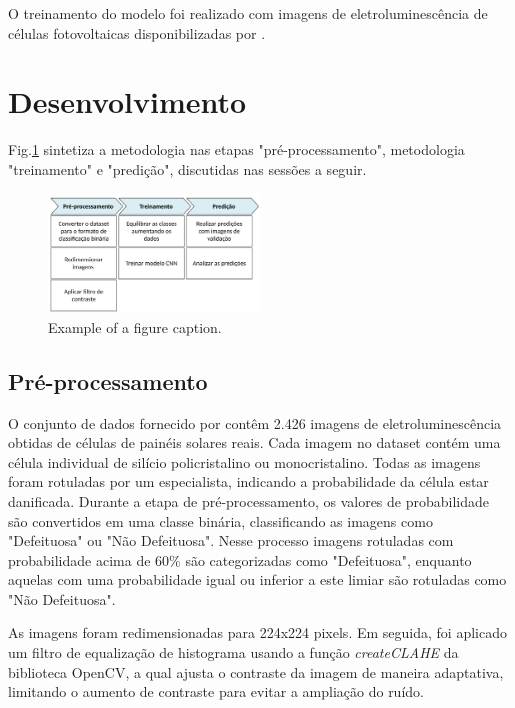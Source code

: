 \documentclass[conference]{IEEEtran}
\begin{document}
O treinamento do modelo foi realizado com imagens de
eletroluminescência de células fotovoltaicas disponibilizadas por
\cite{Deitsch2021}.

\section{Desenvolvimento}

Fig.\ref{fig:metodologia} sintetiza a metodologia nas etapas
"pré-processamento", metodologia
"treinamento" e "predição", discutidas nas sessões a seguir.
\begin{figure}[htbp]
    \centerline{\includegraphics[width=0.5\textwidth]{images/metodologia.png}}
    \caption{Example of a figure caption.}
    \label{fig:metodologia}
\end{figure}

\subsection{Pré-processamento}\label{AA}

O conjunto de dados fornecido por \cite{Deitsch2021} contêm 2.426 imagens de
eletroluminescência obtidas de células de painéis
solares reais. Cada imagem no dataset contém uma célula individual de silício
policristalino ou monocristalino. Todas as imagens foram rotuladas por um
especialista,
indicando a probabilidade da célula estar danificada.
Durante a etapa de pré-processamento, os valores de
probabilidade são convertidos em uma classe binária, classificando as imagens
como "Defeituosa" ou "Não Defeituosa". Nesse processo imagens rotuladas com
probabilidade acima de 60\% são categorizadas como "Defeituosa", enquanto
aquelas com uma probabilidade igual ou inferior a este limiar são rotuladas
como "Não Defeituosa".

As imagens foram redimensionadas para
224x224 pixels. Em seguida, foi aplicado um filtro de equalização de histograma
usando a função \textit{createCLAHE} da biblioteca OpenCV, a
qual
ajusta o contraste da imagem de maneira adaptativa, limitando o aumento de
contraste para evitar a ampliação do ruído.
\end{document}

